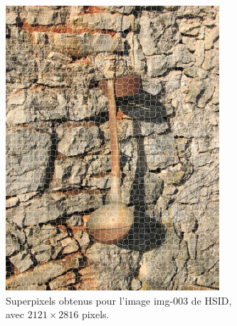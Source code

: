     \begin{figure}[htb]
	\centering
	 \begin{subfigure}[t]{0.45\textwidth}	
			\includegraphics[width=\textwidth]{images/sur-segmentation/CRS/EX1-img-003}
		 	\caption{Superpixels obtenus pour l'image img-003 de HSID, avec $2121 \times 2816$ pixels.}
	\end{subfigure}
	~
	 \begin{subfigure}[t]{0.45\textwidth}	

\end{subfigure}
\end{figure}
